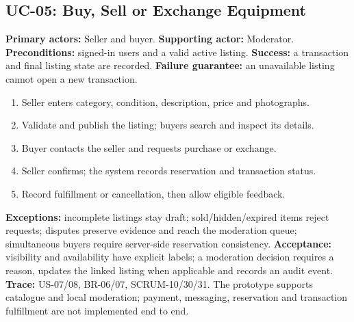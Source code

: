 \subsection{UC-05: Buy, Sell or Exchange Equipment}
\textbf{Primary actors:} Seller and buyer. \textbf{Supporting actor:} Moderator.
\textbf{Preconditions:} signed-in users and a valid active listing.
\textbf{Success:} a transaction and final listing state are recorded.
\textbf{Failure guarantee:} an unavailable listing cannot open a new transaction.
\begin{enumerate}
\item Seller enters category, condition, description, price and photographs.
\item Validate and publish the listing; buyers search and inspect its details.
\item Buyer contacts the seller and requests purchase or exchange.
\item Seller confirms; the system records reservation and transaction status.
\item Record fulfillment or cancellation, then allow eligible feedback.
\end{enumerate}
\textbf{Exceptions:} incomplete listings stay draft; sold/hidden/expired items
reject requests; disputes preserve evidence and reach the moderation queue;
simultaneous buyers require server-side reservation consistency.
\textbf{Acceptance:} visibility and availability have explicit labels; a moderation
decision requires a reason, updates the linked listing when applicable and
records an audit event. \textbf{Trace:} US-07/08, BR-06/07, SCRUM-10/30/31.
The prototype supports catalogue and local moderation; payment, messaging,
reservation and transaction fulfillment are not implemented end to end.

